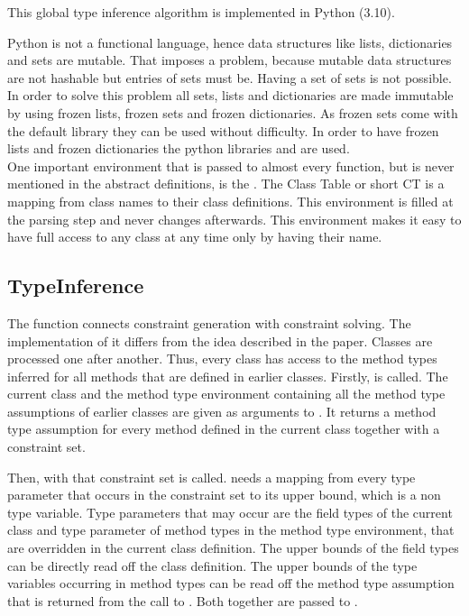 This global type inference algorithm is implemented in Python (3.10).

Python is not a functional language, hence data structures like lists, dictionaries and sets are mutable. That imposes a problem, because mutable data structures are not hashable but entries of sets must be. Having a set of sets is not possible.
In order to solve this problem all sets, lists and dictionaries are made immutable by using frozen lists, frozen sets and frozen dictionaries. As frozen sets come with the default library they can be used without difficulty. In order to have frozen lists and frozen dictionaries the python libraries  and  are used.\\
One important environment that is passed to almost every function, but is never mentioned in the abstract definitions, is the . The Class Table or short CT is a mapping from class names to their class definitions. This environment is filled at the parsing step and never changes afterwards. This environment makes it easy to have full access to any class at any time only by having their name.\\

\subsection{TypeInference}

The function  connects constraint generation with constraint solving. The implementation of it differs from the idea described in the paper.
Classes are processed one after another. Thus, every class has access to the method types inferred for all methods that are defined in earlier classes.
Firstly,  is called. The current class and the method type environment containing all the method type assumptions of earlier classes are given as arguments to . It returns a method type assumption for every
method defined in the current class together with a constraint set.

Then,  with that constraint set is called.  needs a mapping from every type parameter that occurs in the constraint set to its upper bound, which is a non type variable.
Type parameters that may occur are the field types of the current class and type parameter of method types in the method type environment, that are overridden in the current class definition.
The upper bounds of the field types can be directly read off the class definition. The upper bounds of the type variables occurring in method types can be read off the method type assumption that is returned from the call to .
Both together are passed to .

